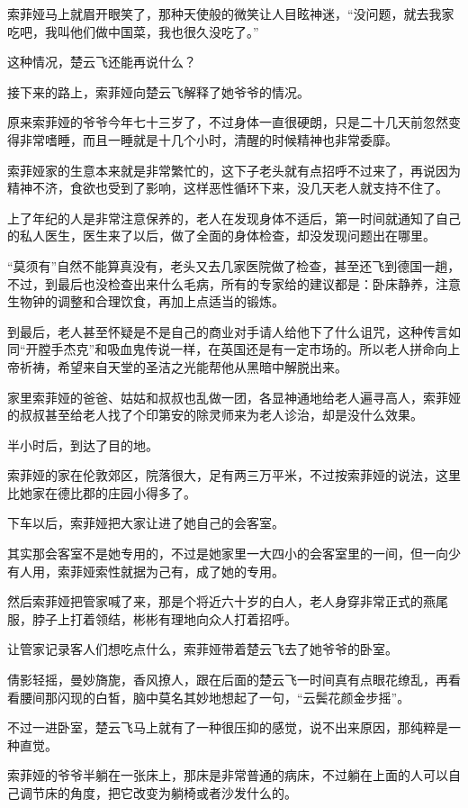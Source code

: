 索菲娅马上就眉开眼笑了，那种天使般的微笑让人目眩神迷，“没问题，就去我家吃吧，我叫他们做中国菜，我也很久没吃了。”

这种情况，楚云飞还能再说什么？

接下来的路上，索菲娅向楚云飞解释了她爷爷的情况。

原来索菲娅的爷爷今年七十三岁了，不过身体一直很硬朗，只是二十几天前忽然变得非常嗜睡，而且一睡就是十几个小时，清醒的时候精神也非常委靡。

索菲娅家的生意本来就是非常繁忙的，这下子老头就有点招呼不过来了，再说因为精神不济，食欲也受到了影响，这样恶性循环下来，没几天老人就支持不住了。

上了年纪的人是非常注意保养的，老人在发现身体不适后，第一时间就通知了自己的私人医生，医生来了以后，做了全面的身体检查，却没发现问题出在哪里。

“莫须有”自然不能算真没有，老头又去几家医院做了检查，甚至还飞到德国一趟，不过，到最后也没检查出来什么毛病，所有的专家给的建议都是：卧床静养，注意生物钟的调整和合理饮食，再加上点适当的锻炼。

到最后，老人甚至怀疑是不是自己的商业对手请人给他下了什么诅咒，这种传言如同“开膛手杰克”和吸血鬼传说一样，在英国还是有一定市场的。所以老人拼命向上帝祈祷，希望来自天堂的圣洁之光能帮他从黑暗中解脱出来。

家里索菲娅的爸爸、姑姑和叔叔也乱做一团，各显神通地给老人遍寻高人，索菲娅的叔叔甚至给老人找了个印第安的除灵师来为老人诊治，却是没什么效果。

半小时后，到达了目的地。

索菲娅的家在伦敦郊区，院落很大，足有两三万平米，不过按索菲娅的说法，这里比她家在德比郡的庄园小得多了。

下车以后，索菲娅把大家让进了她自己的会客室。

其实那会客室不是她专用的，不过是她家里一大四小的会客室里的一间，但一向少有人用，索菲娅索性就据为己有，成了她的专用。

然后索菲娅把管家喊了来，那是个将近六十岁的白人，老人身穿非常正式的燕尾服，脖子上打着领结，彬彬有理地向众人打着招呼。

让管家记录客人们想吃点什么，索菲娅带着楚云飞去了她爷爷的卧室。

倩影轻摇，曼妙旖旎，香风撩人，跟在后面的楚云飞一时间真有点眼花缭乱，再看看腰间那闪现的白皙，脑中莫名其妙地想起了一句，“云鬓花颜金步摇”。

不过一进卧室，楚云飞马上就有了一种很压抑的感觉，说不出来原因，那纯粹是一种直觉。

索菲娅的爷爷半躺在一张床上，那床是非常普通的病床，不过躺在上面的人可以自己调节床的角度，把它改变为躺椅或者沙发什么的。

